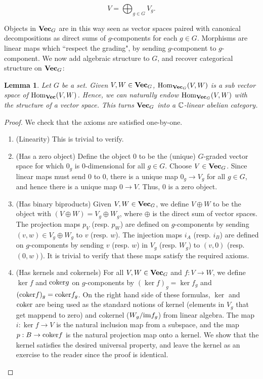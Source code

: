\documentclass{article}
\newtheorem{lemma}{Lemma}[section]
\theoremstyle{definition}
\numberwithin{figure}{section}
\begin{document}
\begin{enumerate}[\thesection .1.]
$$V=\bigoplus_{g\in G}V_g.$$

Objects in $\bold{Vec}_G$ are in this way seen as vector spaces paired with canonical decompositions as direct sums of $g$-components for each $g\in G$. Morphisms are linear maps which ``respect the grading", by sending $g$-component to $g$-component. We now add algebraic structure to $G$, and recover categorical structure on $\bold{Vec}_G$:

\begin{lemma} Let $G$ be a set. Given $V,W\in \bold{Vec}_G$, $\mathrm{Hom}_{\bold{Vec}_G}(V,W)$ is a sub vector space of $\mathrm{Hom}_{\bold{Vec}}(V,W)$. Hence, we can naturally endow $\mathrm{Hom}_{\bold{Vec}_G}(V,W)$ with the structure of a vector space. This turns $\bold{Vec}_G$ into a $\mathbb{C}$-linear abelian category.
\end{lemma}
\begin{proof} We check that the axioms are satisfied one-by-one.

\begin{enumerate}
\item (Linearity) This is trivial to verify.

\item (Has a zero object) Define the object $0$ to be the (unique) $G$-graded vector space for which $0_g$ is $0$-dimensional for all $g\in G$. Choose $V\in \bold{Vec}_G$. Since linear maps must send $0$ to $0$, there is a unique map $0_g\to V_g$ for all $g\in G$, and hence there is a unique map $0\to V$. Thus, $0$ is a zero object.

\item (Has binary biproducts) Given $V,W\in \bold{Vec}_G$, we define $V\oplus W$ to be the object with $(V\oplus W)=V_g\oplus W_g$, where $\oplus$ is the direct sum of vector spaces. The projection maps $p_V$ (resp. $p_W$) are defined on $g$-components by sending $(v,w)\in V_g\oplus W_g$ to $v$ (resp. $w$). The injection maps $i_A$ (resp. $i_B$) are defined on $g$-components by sending $v$ (resp. $w$) in $V_g$ (resp. $W_g$) to $(v,0)$ (resp. $(0,w)$). It is trivial to verify that these maps satisfy the required axioms.

\item (Has kernels and cokernels) For all $V,W\in \bold{Vec}_G$ and $f:V\to W$, we define $\ker f$ and $\mathrm{coker} g$ on $g$-components by $(\ker f)_g=\ker f_g$ and $(\mathrm{coker} f)_g=\mathrm{coker} f_g$. On the right hand side of these formulas, $\ker$ and $\mathrm{coker}$ are being used as the standard notions of kernel (elements in $V_g$ that get mappend to zero) and cokernel ($W_g/\mathrm{im} f_g$) from linear algebra. The map $i: \ker f\to V$ is the natural inclusion map from a subspace, and the map $p:B\to \mathrm{coker} f$ is the natural projection map onto a kernel. We show that the kernel satisfies the desired universal property, and leave the kernel as an exercise to the reader since the proof is identical.


\end{enumerate}
\end{proof}
\end{enumerate}
\end{document}
